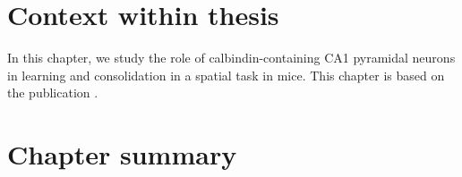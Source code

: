 



\graphicspath{{chapter_calb_ca1/figures/}}

\section{Context within thesis}
In this chapter, we study the role of calbindin-containing CA1 pyramidal neurons in learning and consolidation in a spatial task in mice. This chapter is based on the publication \cite{Voigt2025}.

%
%
%
%

\section{Chapter summary}





